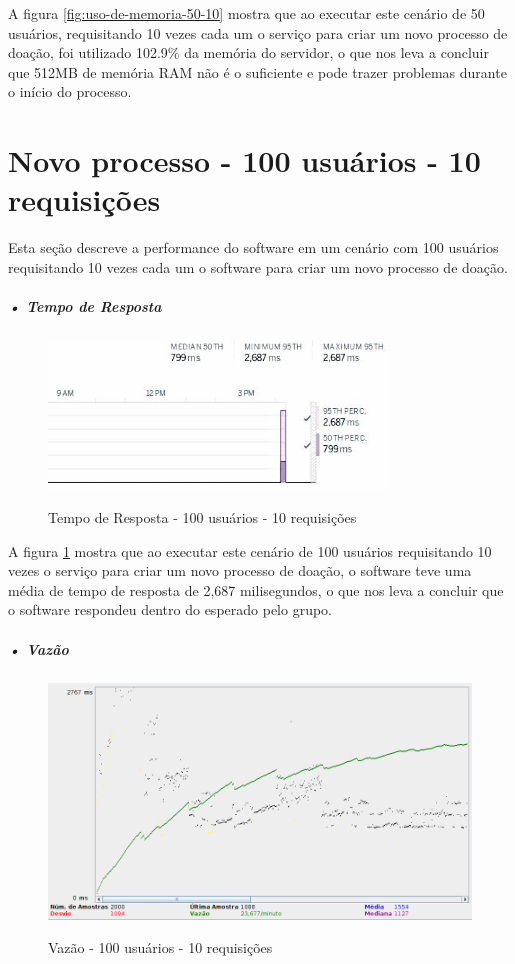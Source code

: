 \documentclass[portuguese,oneside]{tcc}
\begin{document}
A figura \ref{fig:uso-de-memoria-50-10} mostra que ao executar este cenário de 50 usuários, requisitando 10 vezes cada um o serviço para criar um novo processo de doação, foi utilizado 102.9\% da memória do servidor, o que nos leva a concluir que 512MB de memória RAM não é o suficiente e pode trazer problemas durante o início do processo.


\section{Novo processo - 100 usuários - 10 requisições}
Esta seção descreve a performance do software em um cenário com 100 usuários requisitando 10 vezes cada um o software para criar um novo processo de doação.

\subparagraph{• Tempo de Resposta}
\begin{figure}[htp]
\centering
\caption{Tempo de Resposta - 100 usuários - 10 requisições}
\includegraphics[width=9cm]{100-10-response-time}
\label{fig:tempo-reposta-100-10}
\end{figure}

A figura \ref{fig:tempo-reposta-100-10} mostra que ao executar este cenário de 100 usuários requisitando 10 vezes o serviço para criar um novo processo de doação, o software teve uma média de tempo de resposta de 2,687 milisegundos, o que nos leva a concluir que o software respondeu dentro do esperado pelo grupo.

\subparagraph{• Vazão}
\begin{figure}[htp]
\centering
\caption{Vazão - 100 usuários - 10 requisições}
\includegraphics[width=15cm]{100-10-throughput}
\label{fig:throughput-100-10}
\end{figure}
\end{document}
